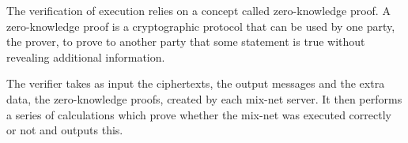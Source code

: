 
The verification of execution relies on a concept called
zero-knowledge proof. A zero-knowledge proof is a cryptographic
protocol that can be used by one party, the prover, to prove to
another party that some statement is true without revealing additional
information.

The verifier takes as input the ciphertexts, the output messages and the extra data, the zero-knowledge proofs, created by each mix-net server. It then performs a series of calculations which prove whether the mix-net was executed correctly or not and outputs this.

\begin{center}
\end{center}

